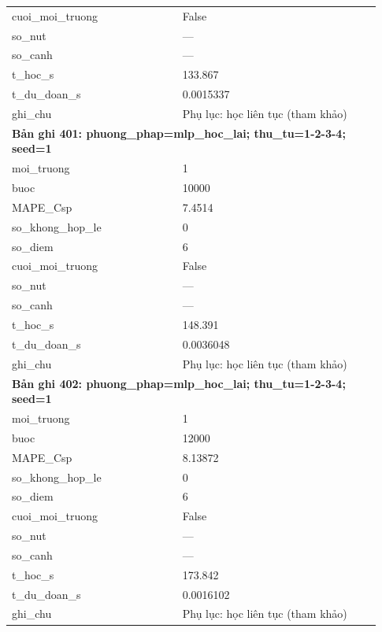 \begin{longtable}{p{0.43\linewidth}p{0.50\linewidth}}
cuoi\_\allowbreak moi\_\allowbreak truong & False \\
so\_\allowbreak nut & — \\
so\_\allowbreak canh & — \\
t\_\allowbreak hoc\_\allowbreak s & 133.867 \\
t\_\allowbreak du\_\allowbreak doan\_\allowbreak s & 0.0015337 \\
ghi\_\allowbreak chu & Phụ lục: học liên tục (tham khảo) \\
\midrule
\multicolumn{2}{p{0.95\linewidth}}{\textbf{Bản ghi 401: phuong\_phap=mlp\_hoc\_lai; thu\_tu=1-2-3-4; seed=1}} \\
moi\_\allowbreak truong & 1 \\
buoc & 10000 \\
MAPE\_\allowbreak Csp & 7.4514 \\
so\_\allowbreak khong\_\allowbreak hop\_\allowbreak le & 0 \\
so\_\allowbreak diem & 6 \\
cuoi\_\allowbreak moi\_\allowbreak truong & False \\
so\_\allowbreak nut & — \\
so\_\allowbreak canh & — \\
t\_\allowbreak hoc\_\allowbreak s & 148.391 \\
t\_\allowbreak du\_\allowbreak doan\_\allowbreak s & 0.0036048 \\
ghi\_\allowbreak chu & Phụ lục: học liên tục (tham khảo) \\
\midrule
\multicolumn{2}{p{0.95\linewidth}}{\textbf{Bản ghi 402: phuong\_phap=mlp\_hoc\_lai; thu\_tu=1-2-3-4; seed=1}} \\
moi\_\allowbreak truong & 1 \\
buoc & 12000 \\
MAPE\_\allowbreak Csp & 8.13872 \\
so\_\allowbreak khong\_\allowbreak hop\_\allowbreak le & 0 \\
so\_\allowbreak diem & 6 \\
cuoi\_\allowbreak moi\_\allowbreak truong & False \\
so\_\allowbreak nut & — \\
so\_\allowbreak canh & — \\
t\_\allowbreak hoc\_\allowbreak s & 173.842 \\
t\_\allowbreak du\_\allowbreak doan\_\allowbreak s & 0.0016102 \\
ghi\_\allowbreak chu & Phụ lục: học liên tục (tham khảo) \\

\end{longtable}
